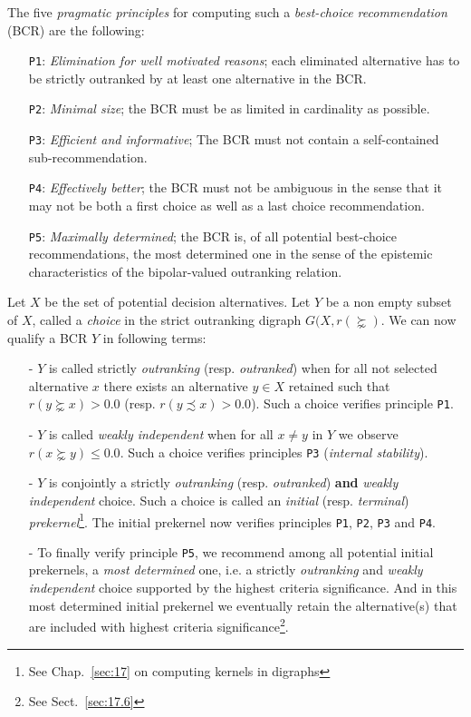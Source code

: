 The five \emph{pragmatic principles} for computing such a \emph{best-choice recommendation} (BCR) are the following:
\begin{itemize}[leftmargin=1cm,listparindent=0em]
\item [\texttt{P1}:] \emph{Elimination for well motivated reasons}; each eliminated alternative has to be strictly outranked by at least one alternative in the BCR.
\item [\texttt{P2}:] \emph{Minimal size}; the BCR must be as limited in cardinality as possible.
\item [\texttt{P3}:] \emph{Efficient and informative}; The BCR must not contain a self-contained sub-recommendation.
\item [\texttt{P4}:] \emph{Effectively better}; the BCR must not be ambiguous in the sense that it may not be both a first choice as well as a last choice recommendation.
\item [\texttt{P5}:] \emph{Maximally determined}; the BCR is, of all potential best-choice recommendations, the most determined one in the sense of the epistemic characteristics of the bipolar-valued outranking relation.
\end{itemize}

Let $X$ be the set of potential decision alternatives. Let $Y$ be a non empty subset of $X$, called a \emph{choice} in the strict outranking digraph $G(X,r(\succnsim )$. We can now qualify a BCR $Y$ in following terms:
\begin{itemize}[leftmargin=0.5cm,listparindent=0em]
\item [-] $Y$ is called strictly \emph{outranking} (resp. \emph{outranked}) when for all not selected alternative $x$ there exists an alternative $y \in X$ retained such that $r(y \succnsim x) > 0.0$ (resp. $r(y \precsim x) > 0.0$). Such a choice verifies principle \texttt{P1}.
\item [-] $Y$ is called \emph{weakly independent} when for all $x \neq y$ in $Y$ we observe $r(x \succnsim y) \leq 0.0$. Such a choice verifies principles \texttt{P3} (\emph{internal stability}).
\item [-] $Y$ is conjointly a strictly \emph{outranking} (resp. \emph{outranked}) \textbf{and} \emph{weakly independent} choice. Such a choice is called an \emph{initial} (resp. \emph{terminal}) \emph{prekernel}\footnote{See Chap.~\ref{sec:17} on computing kernels in digraphs}. The initial prekernel now verifies principles \texttt{P1}, \texttt{P2}, \texttt{P3} and \texttt{P4}. 
\item [-] To finally verify principle \texttt{P5}, we recommend among all potential initial prekernels, a \emph{most determined} one, i.e. a strictly \emph{outranking} and \emph{weakly independent} choice supported by the highest criteria significance. And in this most determined initial prekernel we eventually retain the alternative(s) that are included with highest criteria significance\footnote{See Sect.~\ref{sec:17.6}}.
\end{itemize}

